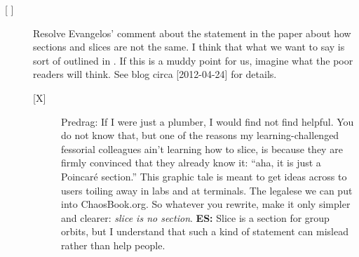 \begin{description}
\begin{description}
\item[{[ ]}] Resolve Evangelos' comment about the statement in the paper
about how sections and slices are not the same. I think that what we want
to say is sort of outlined in . If this is a
muddy point for us, imagine what the poor readers will think. See blog
circa [2012-04-24] for details.
		\begin{description}
			\item[{[X]}] Predrag: If I were just a plumber, I would find
                    not find  helpful. You do
                    not know that, but one of the reasons my
                    learning-challenged fessorial colleagues ain't
                    learning how to slice, is because they are firmly
                    convinced that they already know it: ``aha, it is
                    just a Poincar\'e section.'' This graphic tale is
                    meant to get ideas across to users toiling away in
                    labs and at terminals. The legalese we can put into
                    ChaosBook.org. So whatever you rewrite, make it only
                    simpler and clearer: \emph{slice is no section}.
					{\bf ES:} Slice is a section for group orbits, but
					I understand that such a kind of statement can mislead
					rather than help people.
        \end{description}


\end{description}
\end{description}
